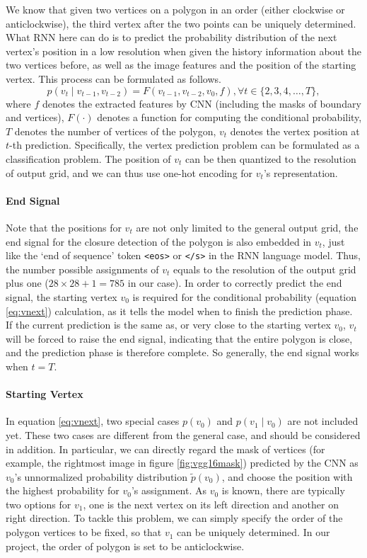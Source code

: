 We know that given two vertices on a polygon in an order (either clockwise or anticlockwise), the third vertex after the two points can be uniquely determined. What RNN here can do is to predict the probability distribution of the next vertex's position in a low resolution when given the history information about the two vertices before, as well as the image features and the position of the starting vertex. This process can be formulated as follows.
\begin{equation}\label{eq:vnext}
	p(v_t \mid v_{t-1}, v_{t-2}) = F(v_{t-1}, v_{t-2}, v_0, f), \forall t \in \{2,3,4,\ldots,T\},
\end{equation}
where $f$ denotes the extracted features by CNN (including the masks of boundary and vertices), $F(\cdot)$ denotes a function for computing the conditional probability, $T$ denotes the number of vertices of the polygon, $v_t$ denotes the vertex position at $t$-th prediction. Specifically, the vertex prediction problem can be formulated as a classification problem. The position of $v_t$ can be then quantized to the resolution of output grid, and we can thus use one-hot encoding for $v_t$'s representation.

\paragraph{End Signal} Note that the positions for $v_t$ are not only limited to the general output grid, the end signal for the closure detection of the polygon is also embedded in $v_t$, just like the `end of sequence' token \lstinline{<eos>} or \lstinline{</s>} in the RNN language model. Thus, the number possible assignments of $v_t$ equals to the resolution of the output grid plus one ($28\times28+1=785$ in our case). In order to correctly predict the end signal, the starting vertex $v_0$ is required for the conditional probability (equation \ref{eq:vnext}) calculation, as it tells the model when to finish the prediction phase. If the current prediction is the same as, or very close to the starting vertex $v_0$, $v_t$ will be forced to raise the end signal, indicating that the entire polygon is close, and the prediction phase is therefore complete. So generally, the end signal works when $t=T$.

\paragraph{Starting Vertex} In equation \ref{eq:vnext}, two special cases $p(v_0)$ and $p(v_1 \mid v_0)$ are not included yet. These two cases are different from the general case, and should be considered in addition. In particular, we can directly regard the mask of vertices (for example, the rightmost image in figure \ref{fig:vgg16mask}) predicted by the CNN as $v_0$'s unnormalized probability distribution $\tilde{p}(v_0)$, and choose the position with the highest probability for $v_0$'s assignment. As $v_0$ is known, there are typically two options for $v_1$, one is the next vertex on its left direction and another on right direction. To tackle this problem, we can simply specify the order of the polygon vertices to be fixed, so that $v_1$ can be uniquely determined. In our project, the order of polygon is set to be anticlockwise.

